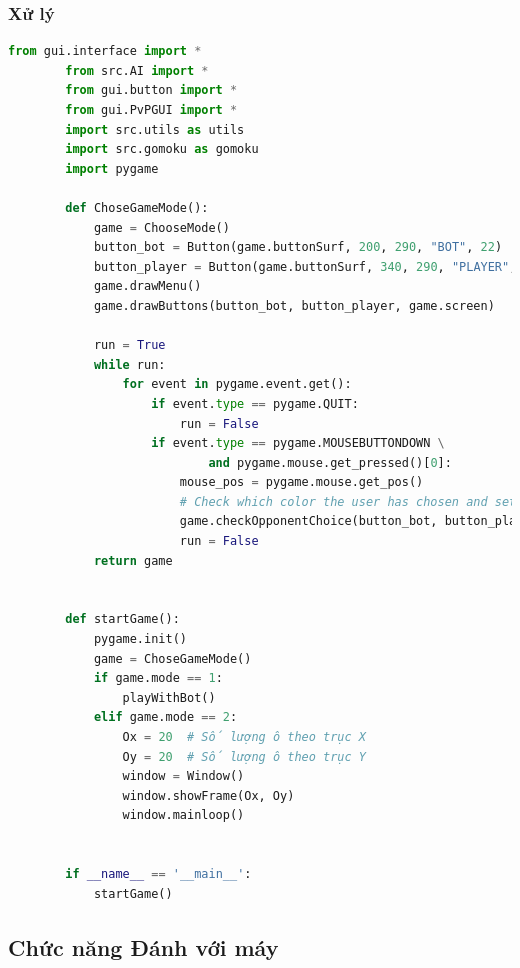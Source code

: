 \documentclass[a4paper]{article}
\begin{document}
    \subsubsection{Xử lý}
    \begin{lstlisting}[language=Python]
        from gui.interface import *
        from src.AI import *
        from gui.button import *
        from gui.PvPGUI import *
        import src.utils as utils
        import src.gomoku as gomoku
        import pygame
        
        def ChoseGameMode():
            game = ChooseMode()
            button_bot = Button(game.buttonSurf, 200, 290, "BOT", 22)
            button_player = Button(game.buttonSurf, 340, 290, "PLAYER", 22)
            game.drawMenu()
            game.drawButtons(button_bot, button_player, game.screen)
        
            run = True
            while run:
                for event in pygame.event.get():
                    if event.type == pygame.QUIT:
                        run = False
                    if event.type == pygame.MOUSEBUTTONDOWN \
                            and pygame.mouse.get_pressed()[0]:
                        mouse_pos = pygame.mouse.get_pos()
                        # Check which color the user has chosen and set the states
                        game.checkOpponentChoice(button_bot, button_player, mouse_pos)
                        run = False
            return game

            
        def startGame():
            pygame.init()
            game = ChoseGameMode()
            if game.mode == 1:
                playWithBot()
            elif game.mode == 2:
                Ox = 20  # Số lượng ô theo trục X
                Oy = 20  # Số lượng ô theo trục Y
                window = Window()
                window.showFrame(Ox, Oy)
                window.mainloop()

        
        if __name__ == '__main__':
            startGame()
    \end{lstlisting}
\subsection{Chức năng Đánh với máy}
\end{document}
